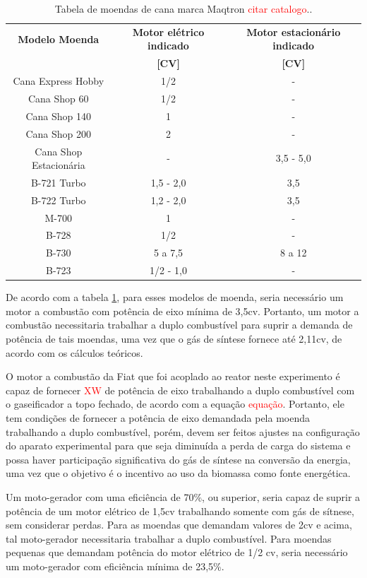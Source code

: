 \begin{table}[h]
	\centering
	\caption{Tabela de moendas de cana marca Maqtron \textcolor{red}{citar catalogo}..}
	\begin{tabular}{|c|c|c|}
	\hline
	\rowcolor{lightgray}\textbf{Modelo Moenda} & \textbf{Motor elétrico indicado} & \textbf{Motor estacionário indicado} \\
	\rowcolor{lightgray} & \textbf{[CV]} & \textbf{[CV]} \\
	\hline
	Cana Express Hobby & 1/2 & - \\
	Cana Shop 60 & 1/2 & - \\
	Cana Shop 140 & 1 & - \\
	Cana Shop 200 & 2 & - \\
	Cana Shop Estacionária & - & 3,5 - 5,0 \\
	B-721 Turbo & 1,5 - 2,0 & 3,5 \\
	B-722 Turbo & 1,2 - 2,0 & 3,5 \\
	M-700 & 1 & - \\
	B-728 & 1/2 & - \\
	B-730 & 5 a 7,5 & 8 a 12 \\
	B-723 & 1/2 - 1,0 & - \\
	\hline
	\end{tabular}
	\label{tabela_moendas}
\end{table}	

De acordo com a tabela \ref{tabela_moendas}, para esses modelos de moenda, seria necessário um motor a combustão com potência de eixo mínima de 3,5cv. Portanto, um motor a combustão necessitaria trabalhar a duplo combustível para suprir a demanda de potência de tais moendas, uma vez que o gás de síntese fornece até 2,11cv, de acordo com os cálculos teóricos.

O motor a combustão da Fiat que foi acoplado ao reator neste experimento é capaz de fornecer \textcolor{red}{XW} de potência de eixo trabalhando a duplo combustível com o gaseificador a topo fechado, de acordo com a equação \textcolor{red}{equação}. Portanto, ele tem condições de fornecer a potência de eixo demandada pela moenda trabalhando a duplo combustível, porém, devem ser feitos ajustes na configuração do aparato experimental para que seja diminuída a perda de carga do sistema e possa haver participação significativa do gás de síntese na conversão da energia, uma vez que o objetivo é o incentivo ao uso da biomassa como fonte energética.

Um moto-gerador com uma eficiência de 70\%, ou superior, seria capaz de suprir a potência de um motor elétrico de 1,5cv trabalhando somente com gás de sítnese, sem considerar perdas. Para as moendas que demandam valores de 2cv e acima, tal moto-gerador necessitaria trabalhar a duplo combustível. Para moendas pequenas que demandam potência do motor elétrico de 1/2 cv, seria necessário um moto-gerador com eficiência mínima de 23,5\%.

		